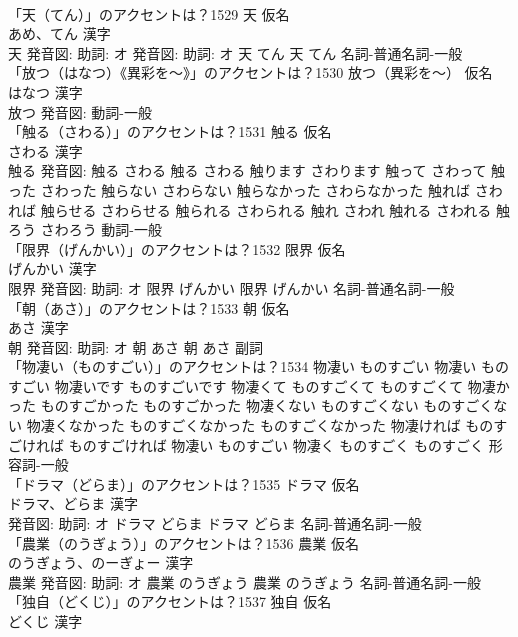 \documentclass[8pt]{extreport}
\begin{document}
\begin{CJK}{UTF8}{min}
\\	「天（てん）」のアクセントは？1529	天 仮名　
\\	あめ、てん 漢字　
\\	天 発音図: 助詞: オ 発音図: 助詞: オ	天 てん		天 てん				名詞-普通名詞-一般 
\\	「放つ（はなつ）《異彩を〜》」のアクセントは？1530	放つ（異彩を〜） 仮名　
\\	はなつ 漢字　
\\	放つ 発音図:							動詞-一般 
\\	「触る（さわる）」のアクセントは？1531	触る 仮名　
\\	さわる 漢字　
\\	触る 発音図:	触る さわる		触る さわる 触ります さわります 触って さわって 触った さわった 触らない さわらない 触らなかった さわらなかった 触れば さわれば 触らせる さわらせる 触られる さわられる 触れ さわれ 触れる さわれる 触ろう さわろう				動詞-一般 
\\	「限界（げんかい）」のアクセントは？1532	限界 仮名　
\\	げんかい 漢字　
\\	限界 発音図: 助詞: オ	限界 げんかい		限界 げんかい				名詞-普通名詞-一般 
\\	「朝（あさ）」のアクセントは？1533	朝 仮名　
\\	あさ 漢字　
\\	朝 発音図: 助詞: オ	朝 あさ		朝 あさ				副詞 
\\	「物凄い（ものすごい）」のアクセントは？1534		物凄い ものすごい		物凄い ものすごい 物凄いです ものすごいです 物凄くて ものすごくて ものすごくて 物凄かった ものすごかった ものすごかった 物凄くない ものすごくない ものすごくない 物凄くなかった ものすごくなかった ものすごくなかった 物凄ければ ものすごければ ものすごければ 物凄い ものすごい 物凄く ものすごく ものすごく				形容詞-一般 
\\	「ドラマ（どらま）」のアクセントは？1535	ドラマ 仮名　
\\	ドラマ、どらま 漢字　
\\	発音図: 助詞: オ	ドラマ どらま		ドラマ どらま				名詞-普通名詞-一般 
\\	「農業（のうぎょう）」のアクセントは？1536	農業 仮名　
\\	のうぎょう、のーぎょー 漢字　
\\	農業 発音図: 助詞: オ	農業 のうぎょう		農業 のうぎょう				名詞-普通名詞-一般 
\\	「独自（どくじ）」のアクセントは？1537	独自 仮名　
\\	どくじ 漢字　

\end{CJK}
\end{document}

